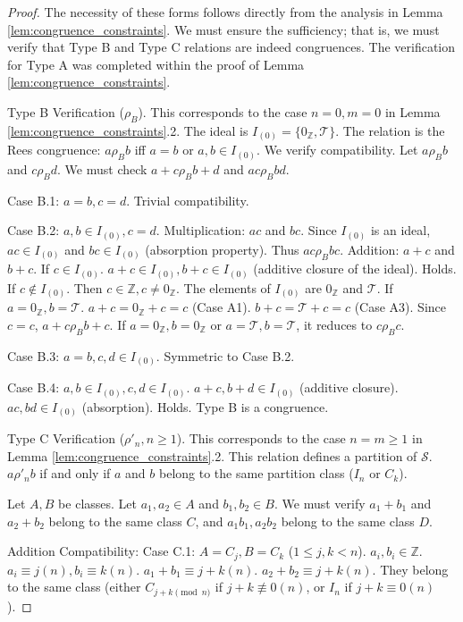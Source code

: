 \documentclass[11pt, a4paper]{article}
\theoremstyle{plain}
\theoremstyle{definition}
\numberwithin{equation}{section}
\newcommand{\Z}{\mathbb{Z}}
\newcommand{\Tobj}{\mathcal{T}} %
\newcommand{\SemiringS}{\mathcal{S}}
\begin{document}
\begin{proof}
The necessity of these forms follows directly from the analysis in Lemma \ref{lem:congruence_constraints}. We must ensure the sufficiency; that is, we must verify that Type B and Type C relations are indeed congruences. The verification for Type A was completed within the proof of Lemma \ref{lem:congruence_constraints}.

Type B Verification ($\rho_B$). This corresponds to the case $n=0, m=0$ in Lemma \ref{lem:congruence_constraints}.2. The ideal is $I_{(0)}=\{0_{\Z}, \Tobj\}$. The relation is the Rees congruence: $a \rho_B b$ iff $a=b$ or $a, b \in I_{(0)}$. We verify compatibility. Let $a \rho_B b$ and $c \rho_B d$. We must check $a+c \rho_B b+d$ and $ac \rho_B bd$.

Case B.1: $a=b, c=d$. Trivial compatibility.

Case B.2: $a, b \in I_{(0)}, c=d$.
Multiplication: $ac$ and $bc$. Since $I_{(0)}$ is an ideal, $ac \in I_{(0)}$ and $bc \in I_{(0)}$ (absorption property). Thus $ac \rho_B bc$.
Addition: $a+c$ and $b+c$.
If $c \in I_{(0)}$. $a+c \in I_{(0)}, b+c \in I_{(0)}$ (additive closure of the ideal). Holds.
If $c \notin I_{(0)}$. Then $c \in \Z, c\neq 0_{\Z}$.
The elements of $I_{(0)}$ are $0_{\Z}$ and $\Tobj$.
If $a=0_{\Z}, b=\Tobj$. $a+c = 0_{\Z}+c = c$ (Case A1). $b+c = \Tobj+c = c$ (Case A3). Since $c=c$, $a+c \rho_B b+c$.
If $a=0_{\Z}, b=0_{\Z}$ or $a=\Tobj, b=\Tobj$, it reduces to $c \rho_B c$.

Case B.3: $a=b, c, d \in I_{(0)}$. Symmetric to Case B.2.

Case B.4: $a, b \in I_{(0)}, c, d \in I_{(0)}$. $a+c, b+d \in I_{(0)}$ (additive closure). $ac, bd \in I_{(0)}$ (absorption). Holds.
Type B is a congruence.

Type C Verification ($\rho'_n, n\ge 1$). This corresponds to the case $n=m\ge 1$ in Lemma \ref{lem:congruence_constraints}.2. This relation defines a partition of $\SemiringS$. $a \rho'_n b$ if and only if $a$ and $b$ belong to the same partition class ($I_n$ or $C_k$).

Let $A, B$ be classes. Let $a_1, a_2 \in A$ and $b_1, b_2 \in B$. We must verify $a_1+b_1$ and $a_2+b_2$ belong to the same class $C$, and $a_1 b_1, a_2 b_2$ belong to the same class $D$.

Addition Compatibility:
Case C.1: $A=C_j, B=C_k$ ($1\le j, k < n$). $a_i, b_i \in \Z$. $a_i \equiv j(n), b_i \equiv k(n)$.
$a_1+b_1 \equiv j+k(n)$. $a_2+b_2 \equiv j+k(n)$. They belong to the same class (either $C_{j+k \pmod{n}}$ if $j+k \not\equiv 0(n)$, or $I_n$ if $j+k\equiv 0(n)$).


\end{proof}
\end{document}

